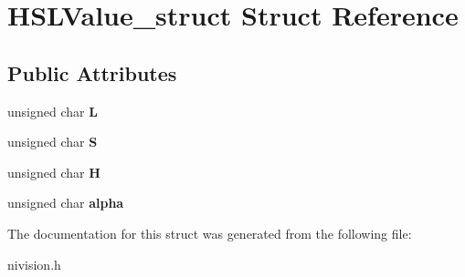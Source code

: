\hypertarget{structHSLValue__struct}{
\section{HSLValue\_\-struct Struct Reference}
\label{structHSLValue__struct}
}
\subsection*{Public Attributes}
\begin{DoxyCompactItemize}
\item 
\hypertarget{structHSLValue__struct_a4174a450f436d081b146b70093213c7d}{
unsigned char {\bfseries L}}
\label{structHSLValue__struct_a4174a450f436d081b146b70093213c7d}

\item 
\hypertarget{structHSLValue__struct_a5fc0193ce8874725a6ca95f792960ece}{
unsigned char {\bfseries S}}
\label{structHSLValue__struct_a5fc0193ce8874725a6ca95f792960ece}

\item 
\hypertarget{structHSLValue__struct_afc7c6b622d49118245832e93e150c00b}{
unsigned char {\bfseries H}}
\label{structHSLValue__struct_afc7c6b622d49118245832e93e150c00b}

\item 
\hypertarget{structHSLValue__struct_aa8c3650c8b64ac67c3dcc107b2724b14}{
unsigned char {\bfseries alpha}}
\label{structHSLValue__struct_aa8c3650c8b64ac67c3dcc107b2724b14}

\end{DoxyCompactItemize}


The documentation for this struct was generated from the following file:\begin{DoxyCompactItemize}
\item 
nivision.h\end{DoxyCompactItemize}
